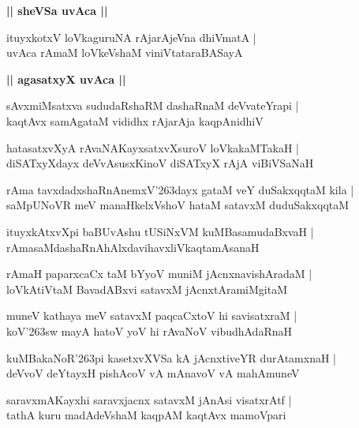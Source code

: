 \documentclass[twoside,12pt,openright]{book}
\def\S{\char'263}
\newcounter{shloka}[chapter]
\def\uvaca#1{\centerline{{\large\textbf{#1}}}}
\begin{document}
\uvaca{|| sheVSa uvAca ||}

\begin{shloka}%
ituyxkotxV loVkaguruNA rAjarAjeVna dhiVmatA |\\
uvAca rAmaM loVkeVshaM viniVtataraBASayA 
\end{shloka}

\uvaca{|| agasatxyX uvAca ||}

\begin{shloka}%
sAvxmiMsatxva sududaRshaRM dashaRnaM deVvateYrapi |\\
kaqtAvx samAgataM vididhx rAjarAja kaqpAnidhiV 
\end{shloka}

\begin{shloka}%
hatasatxvXyA rAvaNAKayxsatxvXsuroV loVkakaMTakaH |\\
diSATxyXdayx deVvAsusxKinoV diSATxyX rAjA viBiVSaNaH 
\end{shloka}

\begin{shloka}%
rAma tavxdadxshaRnAnemxV\S dayx gataM veY duSakxqqtaM kila |\\
saMpUNoVR meV manaHkelxVshoV hataM satavxM duduSakxqqtaM 
\end{shloka}

\begin{shloka}%
ituyxkAtxvXpi baBUvAshu tUSiNxVM kuMBasamudaBxvaH |\\
rAmasaMdashaRnAhAlxdavihavxliVkaqtamAsanaH
\end{shloka}

\begin{shloka}%
rAmaH paparxcaCx taM bYyoV muniM jAcnxnavishAradaM |\\
loVkAtiVtaM BavadABxvi satavxM jAcnxtAramiMgitaM 
\end{shloka}

\begin{shloka}%
muneV kathaya meV satavxM paqcaCxtoV hi savisatxraM |\\
koV\S sw mayA hatoV yoV hi rAvaNoV vibudhAdaRnaH 
\end{shloka}

\begin{shloka}%
kuMBakaNoR\S pi kasetxvXVSa kA jAcnxtiveYR durAtamxnaH |\\
deVvoV deYtayxH pishAcoV vA mAnavoV vA mahAmuneV
\end{shloka}

\begin{shloka}%
saravxmAKayxhi saravxjacnx satavxM jAnAsi visatxrAtf |\\
tathA kuru madAdeVshaM kaqpAM kaqtAvx mamoVpari
\end{shloka}
\end{document}
